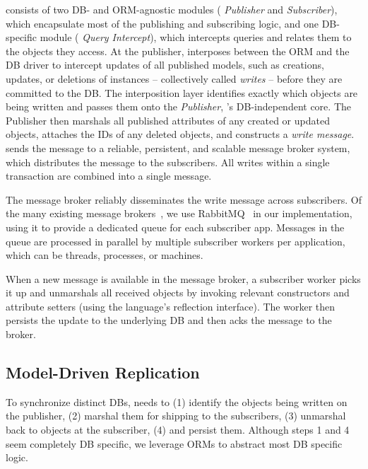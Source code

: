 \synapse consists of two DB- and ORM-agnostic modules ({\em \synapse
Publisher} and {\em \synapse Subscriber}), which encapsulate most of the
publishing and subscribing logic, and one DB-specific module ({\em \synapse
Query Intercept}), which intercepts queries and relates them to the objects they
access. At the publisher, \synapse interposes between the ORM and the DB
driver to intercept updates of all published models, such as creations, updates,
or deletions of instances -- collectively called {\em writes} -- before they are
committed to the DB. The interposition layer identifies exactly which objects
are being written and passes them onto the {\em \synapse Publisher},
\synapse's DB-independent core. The Publisher then marshals all published
attributes of any created or updated objects, attaches the IDs of any deleted
objects, and constructs a {\em write message}. \synapse sends the message to a
reliable, persistent, and scalable message broker system, which distributes the
message to the subscribers. All writes within a single transaction are combined
into a single message.

The message broker reliably disseminates the write message across subscribers.
Of the many existing message brokers~\cite{jms,kafka,rabbitmq},
we use RabbitMQ~\cite{rabbitmq} in our implementation, using it to provide a
dedicated queue for each subscriber app. Messages in the queue are processed in
parallel by multiple subscriber workers per application, which can be threads,
processes, or machines.

When a new message is available in the message broker, a \synapse subscriber
worker picks it up and unmarshals all received objects by invoking relevant
constructors and attribute setters (using the language's reflection interface).
The worker then persists the update to the underlying DB and then acks the
message to the broker.


\subsection{Model-Driven Replication}
\label{sec:arch:cross-db-propagation}

To synchronize distinct DBs, \synapse needs to (1) identify the objects being
written on the publisher, (2) marshal them for shipping to the subscribers, (3)
unmarshal back to objects at the subscriber, (4) and persist them.
Although steps 1 and 4 seem completely DB specific, we leverage ORMs to abstract most DB specific logic.

